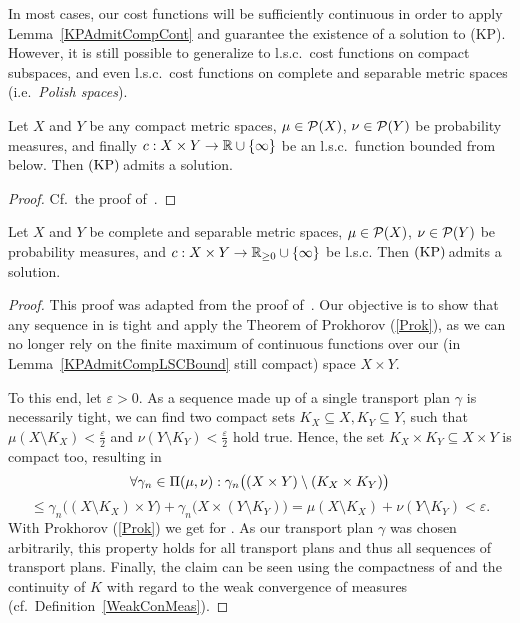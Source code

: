 In most cases, our cost functions will be sufficiently continuous in order to apply Lemma~\ref{KPAdmitCompCont} and guarantee the existence of a solution to (KP). However, it is still possible to generalize to l.s.c.\ cost functions on compact subspaces, and even l.s.c.\ cost functions on complete and separable metric spaces (i.e.\ \textit{Polish spaces}).

\begin{lemma}\label{KPAdmitCompLSCBound}
	Let $X$ and $Y$ be any compact metric spaces, $\mu \in \PM{X}$, $\nu \in \PM{Y}$ be probability measures, and finally $\map[c]{X \times Y}{\R \cup \{ \infty \}}$ be an l.s.c.\ function bounded from below. Then$\text{\normalfont\ (KP)\,}$admits a solution.
\end{lemma}

\begin{proof}
	Cf.~the proof of\ \cite[Theorem~1.5]{San2015}.
\end{proof}

\begin{theorem}\label{KPAdmitPolishLSC}
	Let $X$ and $Y$ be complete and separable metric spaces, $\mu \in \PM{X}$, $\nu \in \PM{Y}$ be probability measures, and $\map[c]{X \times Y}{\RZero \cup \{ \infty \}}$ be l.s.c. Then$\text{\normalfont\ (KP)\,}$admits a solution.
\end{theorem}

\begin{proof}
	This proof was adapted from the proof of\ \cite[Theorem~1.7]{San2015}. Our objective is to show that any sequence in \TP{\mu}{\nu} is tight and apply the Theorem of Prokhorov (\ref{Prok}), as we can no longer rely on the finite maximum of continuous functions over our (in Lemma~\ref{KPAdmitCompLSCBound} still compact) space $X \times Y$.

	To this end, let $\varepsilon > 0$. As a sequence made up of a single transport plan $\gamma$ is necessarily tight, we can find two compact sets $K_X \subseteq X, K_Y \subseteq Y$, such that $\mu(X \setminus K_X) < \frac{\varepsilon}{2}$ and $\nu(Y \setminus K_Y) < \frac{\varepsilon}{2}$ hold true. Hence, the set $K_X \times K_Y \subseteq X \times Y$ is compact too, resulting in
	\[ \forall \gamma_n \in \TP{\mu}{\nu}: \gamma_n\big( (X \times Y) \setminus (K_X \times K_Y) \big) \]
	\[ \le \gamma_n\big( (X \setminus K_X) \times Y \big) + \gamma_n\big( X \times (Y \setminus K_Y) \big) = \mu(X \setminus K_X) + \nu(Y \setminus K_Y) < \varepsilon. \]
	With Prokhorov (\ref{Prok}) we get  for \Ninf. As our transport plan $\gamma$ was chosen arbitrarily, this property holds for all transport plans and thus all sequences of transport plans. Finally, the claim can be seen using the compactness of \TP{\mu}{\nu} and the continuity of $K$ with regard to the weak convergence of measures (cf.\ Definition~\ref{WeakConMeas}).
\end{proof}

